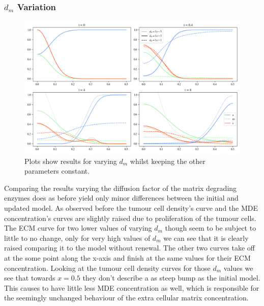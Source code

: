 \subsubsection*{$d_m$ Variation}
\begin{figure}[h]
    \centering
    \includegraphics[width=\textwidth]{resources/images/prolif_dm_variation.png}
    \caption{Plots show results for varying $d_m$ whilst keeping the other parameters constant.}
    \label{fig:prolif_dm_variation}
\end{figure}

Comparing the results varying the diffusion factor of the matrix degrading enzymes does as before yield only minor differences between the initial and updated model. As observed before the tumour cell density's curve and the MDE concentration's curves are slightly raised due to proliferation of the tumour cells. The ECM curve for two lower values of varying $d_m$ though seem to be subject to little to no change, only for very high values of $d_m$ we can see that it is clearly raised comparing it to the model without renewal. The other two curves take off at the some point along the x-axis and finish at the same values for their ECM concentration. Looking at the tumour cell density curves for those $d_m$ values we see that towards $x=0.5$ they don't describe a as steep bump as the initial model. This causes to have little less MDE concentration as well, which is responsible for the seemingly unchanged behaviour of the extra cellular matrix concentration.

